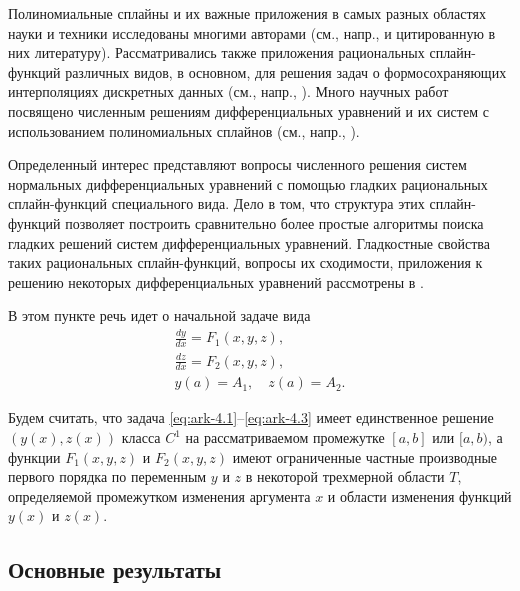 Полиномиальные сплайны и их важные приложения в самых разных областях науки и
техники исследованы многими авторами (см., напр., \cite{bib:ark-14, bib:ark-15, bib:ark-16} и цитированную в них
литературу).
Рассматривались также приложения рациональных сплайн-функций различных видов,
в основном, для решения задач о формосохраняющих интерполяциях дискретных данных
(см., напр., \cite{bib:ark-16, bib:ark-17, bib:ark-18}).
Много научных работ посвящено численным решениям дифференциальных уравнений и
их систем с использованием полиномиальных сплайнов (см., напр., \cite{bib:ark-14, bib:ark-15, bib:ark-16}).

Определенный интерес представляют вопросы численного решения систем нормальных
дифференциальных уравнений с помощью гладких рациональных сплайн-функций специального
вида. Дело в том, что структура этих сплайн-функций позволяет построить сравнительно
более простые алгоритмы поиска гладких решений систем дифференциальных уравнений.
Гладкостные свойства таких рациональных сплайн-функций, вопросы их сходимости,
приложения к решению некоторых
дифференциальных уравнений рассмотрены в \cite{bib:ark-11, bib:ark-12, bib:ark-13}.

В этом пункте речь идет о начальной задаче вида
\begin{gather}\label{eq:ark-4.1}
\frac{dy}{dx}=F_1(x,y,z),
\\\label{eq:ark-4.2}
\frac{dz}{dx}=F_2(x,y,z),
\\\label{eq:ark-4.3}
y(a)=A_1,\quad z(a)=A_2.
\end{gather}

Будем считать, что задача \eqref{eq:ark-4.1}--\eqref{eq:ark-4.3} имеет единственное решение
$(y(x), z(x))$ класса $C^1$ на рассматриваемом промежутке $[a,b]$ или
$[a,b)$, а функции $F_1(x,y,z)$ и $F_2(x,y,z)$ имеют ограниченные частные
 производные первого порядка по переменным $y$ и $z$ в некоторой трехмерной
области $T$, определяемой промежутком изменения аргумента $x$ и области
изменения функций $y(x)$ и $z(x)$.

\subsection{Основные результаты}

